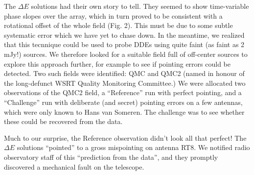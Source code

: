 \documentclass[]{article}
\begin{document}
The $\Delta E$ solutions had their own story to tell. They seemed to show  time-variable phase slopes over the array, which in turn proved to be consistent with a rotational offset of the whole field (Fig. 2). This must be due to some subtle systematic error which we have yet to chase down. In the meantime, we realized that this tecnnique could be used to probe DDEs using quite faint (as faint as 2 mJy!) sources. We therefore looked for a suitable field full of off-center sources to explore this approach further, for example to see if pointing errors could be detected. Two such fields were identified: QMC and QMC2 (named in honour of the long-defunct WSRT Quality Monitoring Committee.) We were allocated two observations of the QMC2 field, a ``Reference'' run with perfect pointing, and a ``Challenge'' run with deliberate (and secret) pointing errors on a few antennas, which were only known to Hans van Someren. The challenge was to see whether these could be recovered from the data.

Much to our surprise, the Reference observation didn't look all that perfect! The $\Delta E$  solutions ``pointed'' to a gross mispointing on antenna RT8. We notified radio observatory staff of this ``prediction from the data'', and they promptly discovered a mechanical fault on the telescope. 
\end{document}
